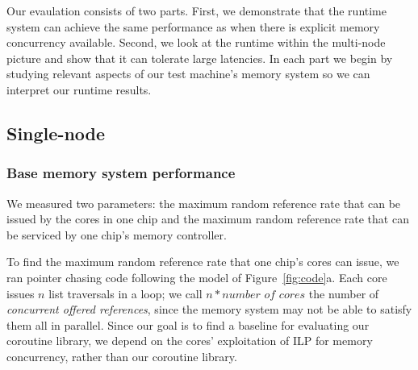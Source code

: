 \documentclass[10pt,nocopyrightspace,preprint]{sigplanconf}
\begin{document}
Our evaulation consists of two parts. First, we demonstrate that the
runtime system can achieve the same performance as when there is
explicit memory concurrency available. Second, we look at the runtime
within the multi-node picture and show that it can tolerate large
latencies. In each part we begin by studying relevant aspects of our
test machine's memory system so we can interpret our runtime results.


\subsection{Single-node}


\subsubsection{Base memory system performance}
\label{subsubsec:evalsinglebase}

We measured two parameters: the maximum random reference
rate that can be issued by the cores in one chip and the maximum random
reference rate that can be serviced by one chip's memory controller. 

To find the maximum random reference rate that one chip's cores
can issue, we ran pointer chasing code following the model of
Figure~\ref{fig:code}a. Each core issues $n$ list traversals
in a loop; we call $n * \textit{number of cores}$ the number of
{\em concurrent offered references}, since the memory system may not
be able to satisfy them all in parallel. Since our goal is to find a
baseline for evaluating our coroutine library, we depend on the
cores' exploitation of ILP for memory concurrency, rather than our coroutine
library.
\end{document}
